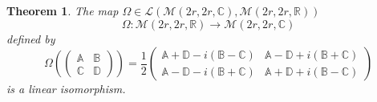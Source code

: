 \documentclass[aps,preprint]{revtex4}
\newtheorem{theorem}{Theorem}
\begin{document}
\begin{theorem}
\label{embedding o real matrices as complex matrices} The map $\Omega \in 
\mathcal{L}\left( \mathcal{M}\left( 2r,2r,\mathbb{C}\right) ,\mathcal{M}%
\left( 2r,2r,\mathbb{R}\right) \right) $ 
\begin{equation}
\Omega :\mathcal{M}\left( 2r,2r,\mathbb{R}\right) \rightarrow \mathcal{M}%
\left( 2r,2r,\mathbb{C}\right)
\end{equation}%
defined by 
\begin{equation}
\Omega \left( \left( 
\begin{array}{cc}
\mathbb{A} & \mathbb{B} \\ 
\mathbb{C} & \mathbb{D}%
\end{array}%
\right) \right) =\frac{1}{2}\left( 
\begin{array}{cc}
\mathbb{A+D}-i\left( \mathbb{B-C}\right) & \mathbb{A-D}+i\left( \mathbb{B+C}%
\right) \\ 
\mathbb{A-D}-i\left( \mathbb{B+C}\right) & \mathbb{A+D}+i\left( \mathbb{B-C}%
\right)%
\end{array}%
\right)
\end{equation}
is a linear isomorphism.


\end{theorem}
\end{document}
